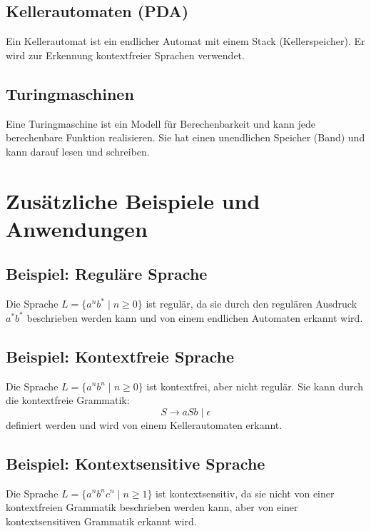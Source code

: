 \documentclass{article}
\begin{document}
	\subsection{Kellerautomaten (PDA)}
	Ein Kellerautomat ist ein endlicher Automat mit einem Stack (Kellerspeicher). Er wird zur Erkennung kontextfreier Sprachen verwendet.
	
	\subsection{Turingmaschinen}
	Eine Turingmaschine ist ein Modell für Berechenbarkeit und kann jede berechenbare Funktion realisieren. Sie hat einen unendlichen Speicher (Band) und kann darauf lesen und schreiben.
	
	\section{Zusätzliche Beispiele und Anwendungen}
	
	\subsection{Beispiel: Reguläre Sprache}
	Die Sprache $L = \{a^n b^* \mid n \geq 0\}$ ist regulär, da sie durch den regulären Ausdruck $a^*b^*$ beschrieben werden kann und von einem endlichen Automaten erkannt wird.
	
	\subsection{Beispiel: Kontextfreie Sprache}
	Die Sprache $L = \{a^n b^n \mid n \geq 0\}$ ist kontextfrei, aber nicht regulär. Sie kann durch die kontextfreie Grammatik:
	\[ S \to aSb \mid \epsilon \]
	definiert werden und wird von einem Kellerautomaten erkannt.
	
	\subsection{Beispiel: Kontextsensitive Sprache}
	Die Sprache $L = \{a^n b^n c^n \mid n \geq 1\}$ ist kontextsensitiv, da sie nicht von einer kontextfreien Grammatik beschrieben werden kann, aber von einer kontextsensitiven Grammatik erkannt wird.
	
\end{document}
